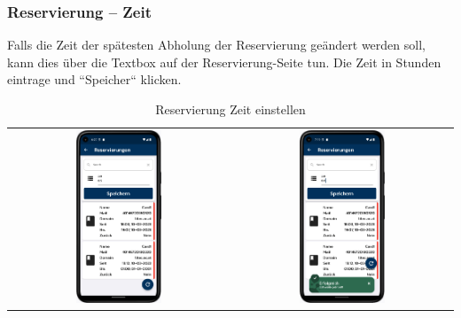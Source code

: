 \newpage

\subsubsection{Reservierung – Zeit} \label{subsubsec:reservationTime}
Falls die Zeit der spätesten Abholung der Reservierung geändert werden soll, kann dies über die Textbox auf der Reservierung-Seite tun. Die Zeit in Stunden eintrage und ``Speicher`` klicken.

\vspace{1cm}
\begin{table}[htbp]
  \centering
  \begin{tabular}{cc}
    \includegraphics[width=0.4\textwidth]{FLUTTER/images/ZB/reservation_page.png} &
    \includegraphics[width=0.4\textwidth]{FLUTTER/images/ZB/reservation_time.png} \\
  \end{tabular}
  \label{tab:example}
  \captionsetup{type=figure}
  \caption{Reservierung Zeit einstellen}
\end{table}

